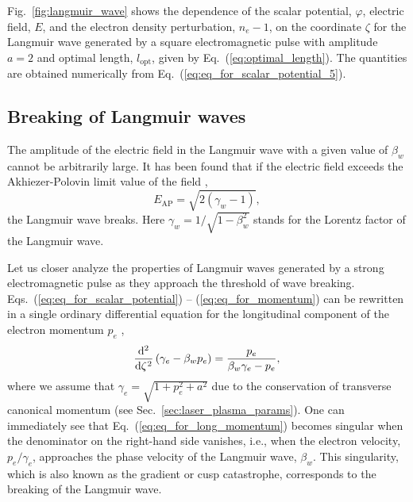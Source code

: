 \documentclass[10pt, a4paper, twoside, openright]{report}
\begin{document}
Fig.~\ref{fig:langmuir_wave} shows the dependence of the scalar potential, $ \varphi $, electric field, $ E $, and the electron density perturbation, $ n_e - 1 $, on the coordinate $ \zeta $ for the Langmuir wave generated by a square electromagnetic pulse with amplitude $ a = 2 $ and optimal length, $ l_{\mathrm{opt}} $, given by Eq.~(\ref{eq:optimal_length}). The quantities are obtained numerically from Eq.~(\ref{eq:eq_for_scalar_potential_5}).

\subsection{Breaking of Langmuir waves}

The amplitude of the electric field in the Langmuir wave with a given value of $ \beta_w $ cannot be arbitrarily large. It has been found that if the electric field exceeds the Akhiezer-Polovin limit value of the field \cite{Akhiezer1956}, 
\begin{equation}\label{eq:akhiezer_polovin}
E_{\mathrm{AP}} = \sqrt{2 \left( \gamma_w - 1 \right)},
\end{equation}
the Langmuir wave breaks. Here $ \gamma_w = 1 / \sqrt{1 - \beta_w^2} $ stands for the Lorentz factor of the Langmuir wave. 

Let us closer analyze the properties of Langmuir waves generated by a strong electromagnetic pulse as they approach the threshold of wave breaking. Eqs.~(\ref{eq:eq_for_scalar_potential}) -- (\ref{eq:eq_for_momentum}) can be rewritten in a single ordinary differential equation for the longitudinal component of the electron momentum $ p_e $ \cite{Panchenko2008, Bulanov2013},
\begin{equation}\label{eq:eq_for_long_momentum}
\diff*[2]{\left( \gamma_e - \beta_w p_e \right)}{\zeta} = \frac{p_e}{\beta_w \gamma_e - p_e},
\end{equation}
where we assume that $ \gamma_e = \sqrt{1 + p_e^2 + a^2} $ due to the conservation of transverse canonical momentum (see Sec.~\ref{sec:laser_plasma_params}). One can immediately see that Eq.~(\ref{eq:eq_for_long_momentum}) becomes singular when the denominator on the right-hand side vanishes, i.e., when the electron velocity, $ p_e / \gamma_e $, approaches the phase velocity of the Langmuir wave, $ \beta_{w} $. This singularity, which is also known as the gradient or cusp catastrophe, corresponds to the breaking of the Langmuir wave.
\end{document}
